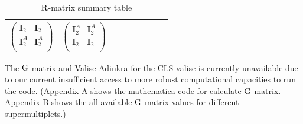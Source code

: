 \documentclass[12pt]{article}
\def\rR{{\rm R}}
\let\bm\relax
\newcommand{\bm}[1]{{\boldsymbol{#1}}}
\begin{document}
\begin{table}[H]
\begin{center}
\begin{tabular}{|m{4.5em}|m{4cm}|m{4cm}|m{4cm}|m{4cm}|m{4cm}|m{1cm}|m{1cm}|m{1cm}|}
$\begin{pmatrix}
\mathbf{I}_2 & \mathbf{I}_2 \\
\mathbf{I}^A_2 & \mathbf{I}^A_2 \\
\end{pmatrix}$&
$\begin{pmatrix}
\mathbf{I}^A_2 & \mathbf{I}^A_2 \\
\mathbf{I}_2 & \mathbf{I}_2 \\
\end{pmatrix}$
\\
\hline
\end{tabular}
\end{center}
\caption{$\bm\rR$-matrix summary table}
\label{tab:my_label}
\end{table}

The ${\bm{\rm G}}$-matrix and Valise Adinkra for the CLS valise is currently unavailable due to our current insufficient access to more robust computational capacities 
to run the code.
(Appendix A shows the mathematica code for calculate $\bm{\rm G}$-matrix. Appendix B shows the all available $\bm{\rm G}$-matrix values for different supermultiplets.)



\newpage
\end{document}
